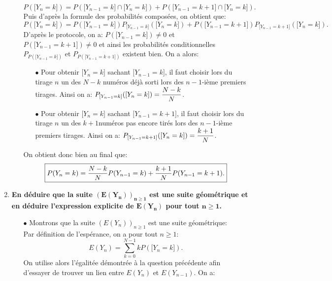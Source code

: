 \documentclass[a4paper, 11pt,reqno]{article}
\begin{document}
\begin{correction}
\begin{enumerate}
\begin{enumerate}
			            $$P(\lbrack Y_n=k\rbrack)=P(\lbrack Y_{n-1}=k\rbrack \cap \lbrack Y_n=k\rbrack) +P(\lbrack Y_{n-1}=k+1\rbrack \cap \lbrack Y_n=k\rbrack).$$
			            Puis d'apr\`{e}s la formule des probabilit\'es compos\'ees, on obtient que:
			            $$P(\lbrack Y_n=k\rbrack)=P(\lbrack Y_{n-1}=k\rbrack)P_{\lbrack Y_{n-1}=k\rbrack}( \lbrack Y_n=k\rbrack) +P(\lbrack Y_{n-1}=k+1\rbrack)P_{\lbrack Y_{n-1}=k+1\rbrack}( \lbrack Y_n=k\rbrack).$$
			            D'apr\`{e}s le protocole, on a: $P(\lbrack Y_{n-1}=k\rbrack)\not= 0$ et $P(\lbrack Y_{n-1}=k+1\rbrack)\not= 0$ et ainsi les probabilit\'es conditionnelles $P_{P(\lbrack Y_{n-1}=k\rbrack)}$ et $P_{P(\lbrack Y_{n-1}=k+1\rbrack)}$ existent bien.
			            On a alors:
			            \begin{itemize}
				            \item[$\bullet$] Pour obtenir $\lbrack Y_{n}=k\rbrack$ sachant $\lbrack Y_{n-1}=k\rbrack$, il faut choisir lors du tirage $n$ un des $N-k$ num\'eros d\'ej\`{a} sorti lors des $n-1$-i\`{e}me premiers tirages. Ainsi on a: $P_{\lbrack Y_{n-1}=k\rbrack}( \lbrack Y_n=k\rbrack)=\displaystyle\frac{N-k}{N}$.
				            \item[$\bullet$] Pour obtenir $\lbrack Y_{n}=k\rbrack$ sachant $\lbrack Y_{n-1}=k+1\rbrack$, il faut choisir lors du tirage $n$ un des $k+1$num\'eros pas encore tir\'es lors des $n-1$-i\`{e}me premiers tirages. Ainsi on a: $P_{\lbrack Y_{n-1}=k+1\rbrack}( \lbrack Y_n=k\rbrack)=\displaystyle\frac{k+1}{N}$.
			            \end{itemize}
			            On obtient donc bien au final que:
			            $$\fbox{$P(Y_n=k)=\displaystyle\frac{N-k}{N}P(Y_{n-1}=k)+\displaystyle\frac{k+1}{N}P(Y_{n-1}=k+1).$}$$
		      \end{enumerate}
		\item \textbf{En d\'eduire que la suite $\mathbf{(E(Y_n))_{n\geq 1}}$ est une suite g\'eom\'etrique et en d\'eduire l'expression explicite de $\mathbf{E(Y_n)}$ pour tout $\mathbf{n\geq 1}$.}
		      \begin{itemize}
			      \item[$\bullet$] Montrons que la suite $(E(Y_n))_{n\geq 1}$ est une suite g\'eom\'etrique:\\
				      \noindent Par d\'efinition de l'esp\'erance, on a pour tout $n\geq 1$:
				      $$E(Y_n)=\sum\limits_{k=0}^{N-1} kP(\lbrack Y_n=k\rbrack).$$
				      On utilise alors l'\'egalit\'ee d\'emontr\'ee \`{a} la question pr\'ec\'edente afin d'essayer de trouver un lien entre $E(Y_n)$ et $E(Y_{n-1})$. On a:

\end{itemize}
\end{enumerate}
\end{correction}
\end{document}
